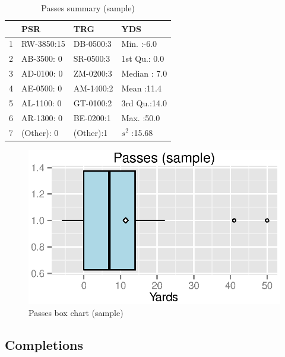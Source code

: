 \documentclass{exam}
\begin{document}
  \begin{table}[H]
    \centering
    \begin{tabular}{rlll}
      \toprule
        & PSR        & TRG       & YDS \\
      \midrule
      1 & RW-3850:15 & DB-0500:3 & Min.   :-6.0   \\
      2 & AB-3500: 0 & SR-0500:3 & 1st Qu.: 0.0   \\
      3 & AD-0100: 0 & ZM-0200:3 & Median : 7.0   \\
      4 & AE-0500: 0 & AM-1400:2 & Mean   :11.4   \\
      5 & AL-1100: 0 & GT-0100:2 & 3rd Qu.:14.0   \\
      6 & AR-1300: 0 & BE-0200:1 & Max.   :50.0   \\
      7 & (Other): 0 & (Other):1 & $s^2$  :15.68 \\
      \bottomrule
    \end{tabular}
    \caption{Passes summary (sample)}
  \end{table}

  \begin{figure}[H]
    \centering
    \includegraphics{figures/nfl/sample_passes_box.eps}
    \caption{Passes box chart (sample)}
  \end{figure}

  \subsection{Completions}
\end{document}
